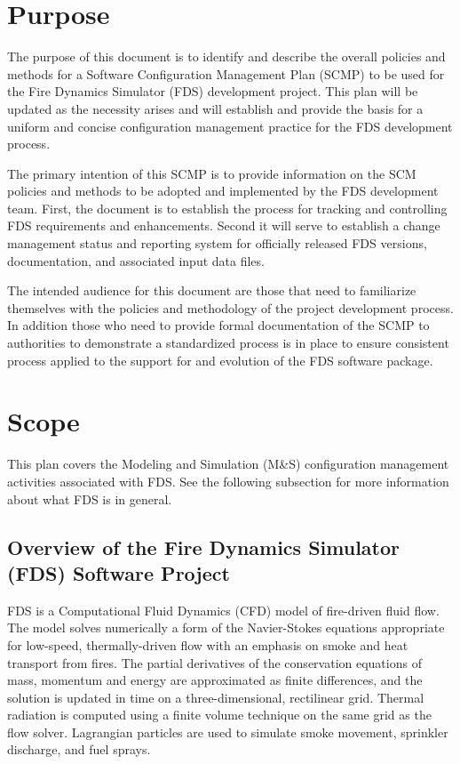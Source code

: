 \documentclass[11pt]{book}
\begin{document}
\section{Purpose}

The purpose of this document is to identify and describe the overall policies and methods for a Software Configuration Management Plan (SCMP) to be used for the Fire Dynamics Simulator (FDS) development project.  This plan will be updated as the necessity arises and will establish and provide the basis for a uniform and concise configuration management practice for the FDS development process.

The primary intention of this SCMP is to provide information on the SCM policies and methods to be adopted and
implemented by the FDS development team.  First, the document is to establish the process for tracking and controlling
FDS requirements and enhancements.  Second it will serve to establish a change management status and reporting system for
officially released FDS versions, documentation, and associated input data files.

The intended audience for this document are those that need to familiarize themselves with the policies and methodology of the project development process.  In addition those who need to provide formal documentation of the SCMP to authorities to demonstrate a standardized process is in place to ensure consistent process applied to the support for and evolution of the FDS software package.

\section{Scope}

This plan covers the Modeling and Simulation (M\&S) configuration management activities associated with FDS. See the following subsection for more information about what FDS is in general.

\subsection{Overview of the Fire Dynamics Simulator (FDS) Software Project}

FDS is a Computational Fluid Dynamics (CFD) model of fire-driven fluid flow.
The model solves numerically a form of the Navier-Stokes equations appropriate
for low-speed, thermally-driven flow with an emphasis on smoke and heat transport
from fires. The partial derivatives of the conservation equations of mass, momentum and energy are approximated
as finite differences, and the solution is updated in time on a three-dimensional, rectilinear grid.
Thermal radiation is computed using a finite volume technique on the same grid as the flow solver.
Lagrangian particles are used to simulate smoke movement, sprinkler discharge, and fuel sprays.
\end{document}
